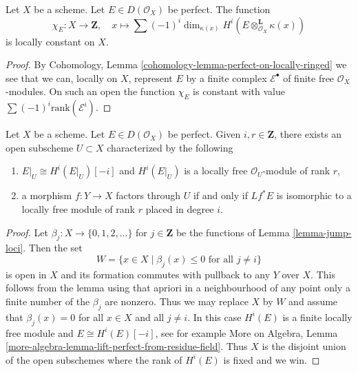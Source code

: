\begin{lemma}
\label{lemma-chi-locally-constant}
Let $X$ be a scheme. Let $E \in D(\mathcal{O}_X)$ be perfect.
The function
$$
\chi_E : X \longrightarrow \mathbf{Z},\quad
x \longmapsto \sum (-1)^i
\dim_{\kappa(x)} H^i(E \otimes_{\mathcal{O}_X}^\mathbf{L} \kappa(x))
$$
is locally constant on $X$.
\end{lemma}

\begin{proof}
By Cohomology, Lemma
\ref{cohomology-lemma-perfect-on-locally-ringed}
we see that we can, locally on $X$, represent $E$ by a finite
complex $\mathcal{E}^\bullet$ of finite free $\mathcal{O}_X$-modules.
On such an open the function $\chi_E$ is constant with value
$\sum (-1)^i \text{rank}(\mathcal{E}^i)$.
\end{proof}

\begin{lemma}
\label{lemma-open-where-cohomology-in-degree-i-rank-r}
Let $X$ be a scheme. Let $E \in D(\mathcal{O}_X)$ be perfect.
Given $i, r \in \mathbf{Z}$, there exists an
open subscheme $U \subset X$ characterized by the following
\begin{enumerate}
\item $E|_U \cong H^i(E|_U)[-i]$ and $H^i(E|_U)$ is a locally free
$\mathcal{O}_U$-module of rank $r$,
\item a morphism $f : Y \to X$ factors through $U$ if and only if
$Lf^*E$ is isomorphic to a locally free module of rank $r$
placed in degree $i$.
\end{enumerate}
\end{lemma}

\begin{proof}
Let $\beta_j : X \to \{0, 1, 2, \ldots\}$ for $j \in \mathbf{Z}$
be the functions of Lemma \ref{lemma-jump-loci}. Then the set
$$
W = \{x \in X \mid \beta_j(x) \leq 0\text{ for all }j \not = i\}
$$
is open in $X$ and its formation commutes with pullback to any
$Y$ over $X$. This follows from the lemma using that
apriori in a neighbourhood of any point only a finite number
of the $\beta_j$ are nonzero. Thus we may replace $X$ by $W$
and assume that $\beta_j(x) = 0$ for all $x \in X$ and all $j \not = i$.
In this case $H^i(E)$ is a finite locally free module and
$E \cong H^i(E)[-i]$, see for example 
More on Algebra, Lemma
\ref{more-algebra-lemma-lift-perfect-from-residue-field}.
Thus $X$ is the disjoint union of the open subschemes where the
rank of $H^i(E)$ is fixed and we win.
\end{proof}

